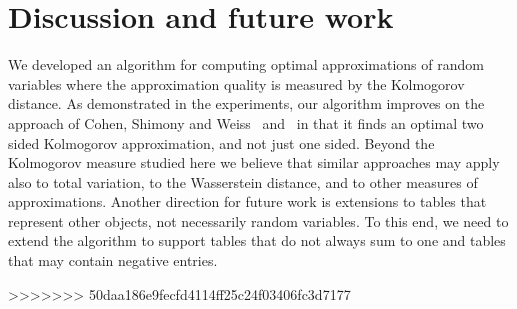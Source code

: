 \documentclass{article}
\DeclareMathOperator{\KlmApprox}{KolmogorovApprox}
\begin{document}
\section{Discussion and future work}\label{sec:discussion}

We developed an algorithm for computing optimal approximations of random variables where the approximation quality is measured by the Kolmogorov distance.
As demonstrated in the experiments, our algorithm improves on the approach of Cohen, Shimony and Weiss~\cite{cohen2015estimating} and~\cite{CohenGW18} in that it finds an optimal two sided Kolmogorov approximation, and not just one sided. Beyond the Kolmogorov measure studied here we believe that similar approaches may apply also to total variation, to the Wasserstein distance, and to other measures of approximations. Another direction for future work is extensions to tables that represent other objects, not necessarily random variables. To this end, we need to extend the algorithm to support tables that do not always sum to one and tables that may contain negative entries.


{}


>>>>>>> 50daa186e9fecfd4114ff25c24f03406fc3d7177
\end{document}
